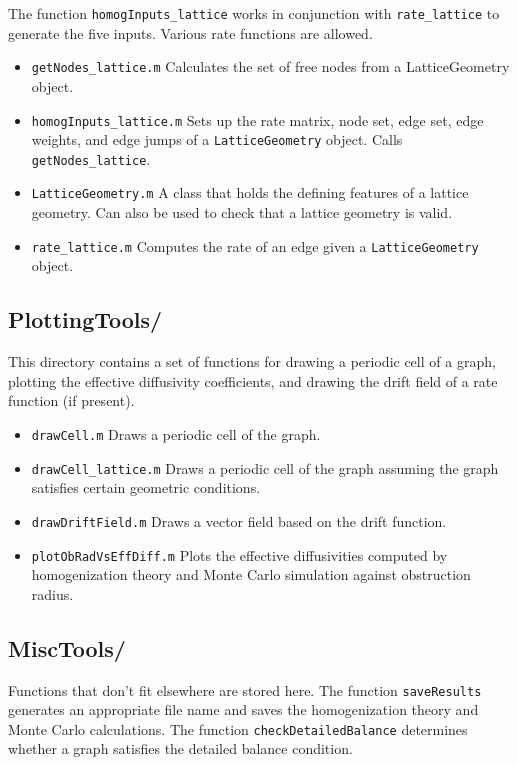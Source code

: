 \documentclass[11pt, oneside]{article}   	%
\theoremstyle{definition}
\begin{document}
The function \texttt{homogInputs\_lattice} works in conjunction with \texttt{rate\_lattice} to generate the five inputs. Various rate functions are allowed.

\begin{itemize}
\item \texttt{getNodes\_lattice.m} Calculates the set of free nodes from a LatticeGeometry object.
\item \texttt{homogInputs\_lattice.m} Sets up the rate matrix, node set, edge set, edge weights, and edge jumps of a \texttt{LatticeGeometry} object. Calls \texttt{getNodes\_lattice}.
\item \texttt{LatticeGeometry.m} A class that holds the defining features of a lattice geometry. Can also be used to check that a lattice geometry is valid.
\item \texttt{rate\_lattice.m} Computes the rate of an edge given a \texttt{LatticeGeometry} object.
\end{itemize}

\subsection{PlottingTools/}
This directory contains a set of functions for drawing a periodic cell of a graph, plotting the effective diffusivity coefficients, and drawing the drift field of a rate function (if present).
\begin{itemize}
\item \texttt{drawCell.m} Draws a periodic cell of the graph.
\item \texttt{drawCell\_lattice.m} Draws a periodic cell of the graph assuming the graph satisfies certain geometric conditions.
\item \texttt{drawDriftField.m} Draws a vector field based on the drift function.
\item \texttt{plotObRadVsEffDiff.m} Plots the effective diffusivities computed by homogenization theory and Monte Carlo simulation against obstruction radius.
\end{itemize}

\subsection{MiscTools/}
Functions that don't fit elsewhere are stored here. The function \texttt{saveResults} generates an appropriate file name and saves the homogenization theory and Monte Carlo calculations. The function \texttt{checkDetailedBalance} determines whether a graph satisfies the detailed balance condition.
\end{document}
